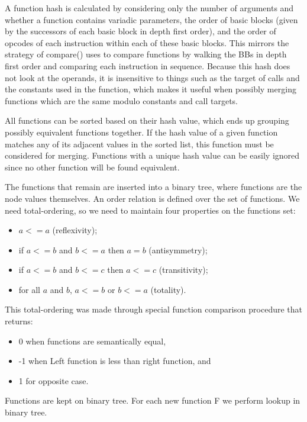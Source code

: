 A function hash is calculated by considering only the number of arguments and
whether a function contains variadic parameters, the order of basic blocks (given by the
successors of each basic block in depth first order), and the order of
opcodes of each instruction within each of these basic blocks.
This mirrors the strategy of compare() uses to compare functions by walking the BBs in depth
first order and comparing each instruction in sequence. Because this hash
does not look at the operands, it is insensitive to things such as the
target of calls and the constants used in the function, which makes it useful
when possibly merging functions which are the same modulo constants and call
targets.


All functions can be sorted based on their hash value, which ends up grouping
possibly equivalent functions together.
If the hash value of a given function matches any of its adjacent values in
the sorted list, this function must be considered for merging.
Functions with a unique hash value can be easily ignored since no other function
will be found equivalent.


The functions that remain are inserted into a binary tree, where functions are
the node values themselves.
An order relation is defined over the set of functions.
We need total-ordering, so we need to maintain four properties on the functions set:
\begin{itemize}
\item $a <= a$ (reflexivity);
\item if $a <= b$ and $b <= a$ then $a = b$ (antisymmetry);
\item if $a <= b$ and $b <= c$ then $a <= c$ (transitivity);
\item for all $a$ and $b$, $a <= b$ or $b <= a$ (totality).
\end{itemize}
This total-ordering was made through special function comparison procedure that
returns:
\begin{itemize}
\item 0 when functions are semantically equal,
\item -1 when Left function is less than right function, and
\item 1 for opposite case.
\end{itemize}

Functions are kept on binary tree. For each new function F we perform
lookup in binary tree.





